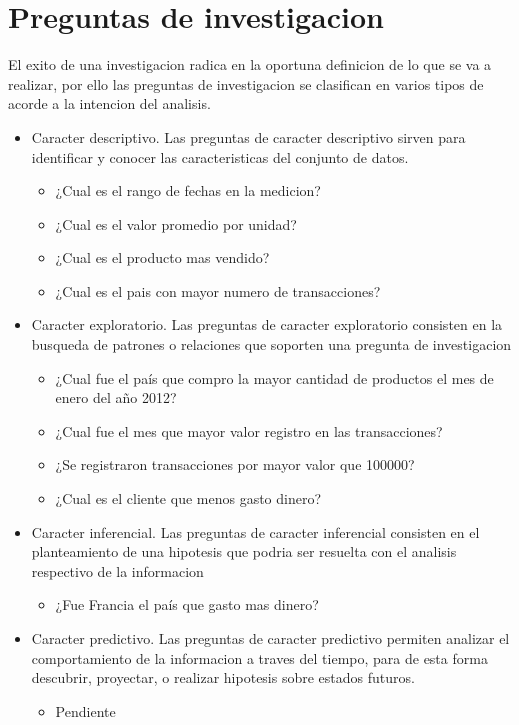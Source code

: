 \section{Preguntas de investigacion}
El exito de una investigacion radica en la oportuna definicion de lo que se va a realizar, por ello las preguntas de investigacion se clasifican en varios tipos de acorde a la intencion del analisis.
 \begin{itemize}
  \item{Caracter descriptivo.}
  Las preguntas de caracter descriptivo sirven para identificar y conocer las caracteristicas del conjunto de datos.
  \begin{itemize}
   \item ¿Cual es el rango de fechas en la medicion?
   \item ¿Cual es el valor promedio por unidad?
   \item ¿Cual es el producto mas vendido?
   \item ¿Cual es el pais con mayor numero de transacciones?
  \end{itemize}
  \item{Caracter exploratorio.}
   Las preguntas de caracter exploratorio consisten en la busqueda de patrones o relaciones que soporten una pregunta de investigacion
  \begin{itemize}
   \item ¿Cual fue el país que compro la mayor cantidad de productos el mes de enero del año 2012?
   \item ¿Cual fue el mes que mayor valor registro en las transacciones?
   \item ¿Se registraron transacciones por mayor valor que 100000?
   \item ¿Cual es el cliente que menos gasto dinero?
  \end{itemize}
  \item{Caracter inferencial.}
   Las preguntas de caracter inferencial consisten en el planteamiento de una hipotesis que podria ser resuelta con el analisis respectivo de la informacion
  \begin{itemize}
   \item ¿Fue Francia el país que gasto mas dinero?
  \end{itemize}
  \item{Caracter predictivo.}
   Las preguntas de caracter predictivo permiten analizar el comportamiento de la informacion a traves del tiempo, para de esta forma descubrir, proyectar, o realizar hipotesis sobre estados futuros.
  \begin{itemize}
   \item Pendiente
  \end{itemize}
 \end{itemize}